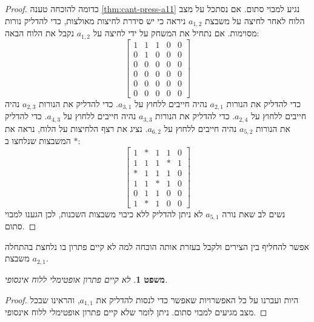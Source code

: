 \documentclass[12pt,leqno]{article}
\theoremstyle{theoremdd}
\newtheorem{theorem}{משפט}[section]
\begin{document}
\begin{proof}
    כדומה להוכחה 
    טענה 
    \ref{thm:cant-press-a11}
    נגיע למבוי סתום.
    אם נסתכל על מצב הלוח לאחר לחיצה על משבצת 
   $a_{1,2}$ 
   ניראה כי יש סידרת לחיצות מאולצות, כדי להדליק נורות מסוימות.
   אם נתחיל את המשחק על ידי לחיצה על 
   $a_{1,2}$
   נקבל את הלוח הבאה:
   \[
        \begin{bmatrix}
            1 & 1 & 1 & 0 & 0 \\
            0 & 1 & 0 & 0 & 0 \\
            0 & 0 & 0 & 0 & 0 \\
            0 & 0 & 0 & 0 & 0 \\
            0 & 0 & 0 & 0 & 0 \\
            0 & 0 & 0 & 0 & 0
        \end{bmatrix}
    \]
    כדי להדליק את הנורות 
    $a_{2,1}$
    נהיה חייבים ללחוץ על 
    $a_{3,1}$.
    כדי להדליק את הנורות 
    $a_{2,3}$
    נהיה חייבים ללחוץ על 
    $a_{2,4}$.
    כדי להדליק את הנורות 
    $a_{3,3}$
    נהיה חייבים ללחוץ על 
    $a_{4,3}$.
    כדי להדליק את הנורות 
    $a_{5,2}$
    נהיה חייבים ללחוץ על 
    $a_{6,2}$.
    נציג את רצף הלחיצות על הלוח,
    נראה את המשבצות שנלחצו
    ב
    $*$:
    \begin{equation}
        \label{eq:with-sol-4x4}
        \begin{bmatrix}
            1 & * & 1 & 1 & 0 \\
            1 & 1 & 1 & * & 1 \\
            * & 1 & 1 & 1 & 0 \\
            1 & 1 & * & 1 & 0 \\
            0 & 1 & 1 & 0 & 0 \\
            1 & * & 1 & 0 & 0
        \end{bmatrix}
    \end{equation}
    נשים לב 
    שאת נורה 
    $a_{5,1}$
    לא ניתן להדליק ללא כיבוי משבצות השכנות,
    לכן הגענו למבוי סתום.
\end{proof}
אפשר להחליף בין הצירים ולקבל בעזרת אותה הוכחה 
למה לא קיים פתרון 
בו נלחצת בהתחלה משבצת 
$a_{2,1}$.
\begin{theorem}
    לא קיים פתרון אופטימלי ללוח אינסופי.
\end{theorem}
\begin{proof}
    היות ועברנו על כל האפשרויות שאפשר 
    כדי לנסות להדליק את 
    $a_{1,1}$,
    והראינו שבכל מצב מגיעים למבוי סתום.
    ניתן לומר שלא קיים פתרון אופטימלי ללוח אינסופי.
\end{proof}
\end{document}
